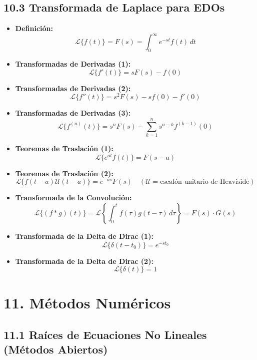 \documentclass[11pt,a4paper]{article}
\begin{document}
\subsection*{10.3 Transformada de Laplace para EDOs}

\begin{itemize}
  \item \textbf{Definición:}
  \[
    \mathcal{L}\{f(t)\} = F(s) = \int_0^\infty e^{-st} f(t) \, dt
  \]
  \item \textbf{Transformadas de Derivadas (1):}
  \[
    \mathcal{L}\{f'(t)\} = s F(s) - f(0)
  \]
  \item \textbf{Transformadas de Derivadas (2):}
  \[
    \mathcal{L}\{f''(t)\} = s^2 F(s) - s f(0) - f'(0)
  \]
  \item \textbf{Transformadas de Derivadas (3):}
  \[
    \mathcal{L}\{f^{(n)}(t)\} = s^n F(s) - \sum_{k=1}^n s^{n - k} f^{(k - 1)}(0)
  \]
  \item \textbf{Teoremas de Traslación (1):}
  \[
    \mathcal{L}\{e^{at} f(t)\} = F(s - a)
  \]
  \item \textbf{Teoremas de Traslación (2):}
  \[
    \mathcal{L}\{f(t - a)\mathcal{U}(t - a)\} = e^{-as} F(s) \quad (\mathcal{U} = \text{escalón unitario de Heaviside})
  \]
  \item \textbf{Transformada de la Convolución:}
  \[
    \mathcal{L}\{(f * g)(t)\} = \mathcal{L}\left\{ \int_0^t f(\tau)g(t - \tau) \, d\tau \right\} = F(s) \cdot G(s)
  \]
  \item \textbf{Transformada de la Delta de Dirac (1):}
  \[
    \mathcal{L}\{\delta(t - t_0)\} = e^{-s t_0}
  \]
  \item \textbf{Transformada de la Delta de Dirac (2):}
  \[
    \mathcal{L}\{\delta(t)\} = 1
  \]
\end{itemize}

\section*{11. Métodos Numéricos}

\subsection*{11.1 Raíces de Ecuaciones No Lineales (Métodos Abiertos)}
\end{document}
